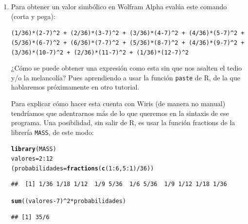 \documentclass[10pt,a4paper]{article}\usepackage[]{graphicx}\usepackage[]{color}
\makeatletter
\newcommand{\hlnum}[1]{\textcolor[rgb]{0.686,0.059,0.569}{#1}}%
\newcommand{\hlopt}[1]{\textcolor[rgb]{0,0,0}{#1}}%
\newcommand{\hlstd}[1]{\textcolor[rgb]{0.345,0.345,0.345}{#1}}%
\newcommand{\hlkwb}[1]{\textcolor[rgb]{0.69,0.353,0.396}{#1}}%
\newcommand{\hlkwd}[1]{\textcolor[rgb]{0.737,0.353,0.396}{\textbf{#1}}}%
\newenvironment{kframe}{%
 \def\at@end@of@kframe{}%
 \ifinner\ifhmode%
  \def\at@end@of@kframe{\end{minipage}}%
  \begin{minipage}{\columnwidth}%
 \fi\fi%
 \def\FrameCommand##1{\hskip\@totalleftmargin \hskip-\fboxsep
 \colorbox{shadecolor}{##1}\hskip-\fboxsep
     \hskip-\linewidth \hskip-\@totalleftmargin \hskip\columnwidth}%
 \MakeFramed {\advance\hsize-\width
   \@totalleftmargin\z@ \linewidth\hsize
   \@setminipage}}%
 {\par\unskip\endMakeFramed%
 \at@end@of@kframe}
\newenvironment{knitrout}{}{} %
\makeatother
\begin{document}
\begin{enumerate}
  \item Para obtener un valor simbólico en Wolfram Alpha evalúa este comando (corta y pega):
  \begin{center}
    {\tt\small (1/36)*(2-7)\verb/^/2 + (2/36)*(3-7)\verb/^/2 + (3/36)*(4-7)\verb/^/2 + (4/36)*(5-7)\verb/^/2 + (5/36)*(6-7)\verb/^/2 + (6/36)*(7-7)\verb/^/2 + (5/36)*(8-7)\verb/^/2 + (4/36)*(9-7)\verb/^/2 + (3/36)*(10-7)\verb/^/2 + (2/36)*(11-7)\verb/^/2 + (1/36)*(12-7)\verb/^/2}
  \end{center}
  ¿Cómo se puede obtener una expresión como esta sin que nos asalten el tedio y/o la melancolía? Pues aprendiendo a usar la función {\tt paste} de R, de la que hablaremos próximamente en otro tutorial.
%

  Para explicar cómo hacer esta cuenta con Wiris (de manera no manual) tendríamos que adentrarnos más de lo que queremos en la sintaxis de ese programa. Una posibilidad, sin salir de R, es usar la función fractions de la librería {\tt MASS}, de este modo:
\begin{knitrout}
\color{fgcolor}\begin{kframe}
\begin{alltt}
  \hlkwd{library}\hlstd{(MASS)}
  \hlstd{valores} \hlkwb{=} \hlnum{2}\hlopt{:}\hlnum{12}
  \hlstd{(probabilidades}\hlkwb{=} \hlkwd{fractions}\hlstd{(}\hlkwd{c}\hlstd{(}\hlnum{1}\hlopt{:}\hlnum{6}\hlstd{,}\hlnum{5}\hlopt{:}\hlnum{1}\hlstd{)}\hlopt{/}\hlnum{36}\hlstd{))}
\end{alltt}
\begin{verbatim}
##  [1] 1/36 1/18 1/12  1/9 5/36  1/6 5/36  1/9 1/12 1/18 1/36
\end{verbatim}
\begin{alltt}
  \hlkwd{sum}\hlstd{((valores}\hlopt{-}\hlnum{7}\hlstd{)}\hlopt{^}\hlnum{2}\hlopt{*}\hlstd{probabilidades)}
\end{alltt}
\begin{verbatim}
## [1] 35/6
\end{verbatim}
\end{kframe}
\end{knitrout}


\end{enumerate}
\end{document}
